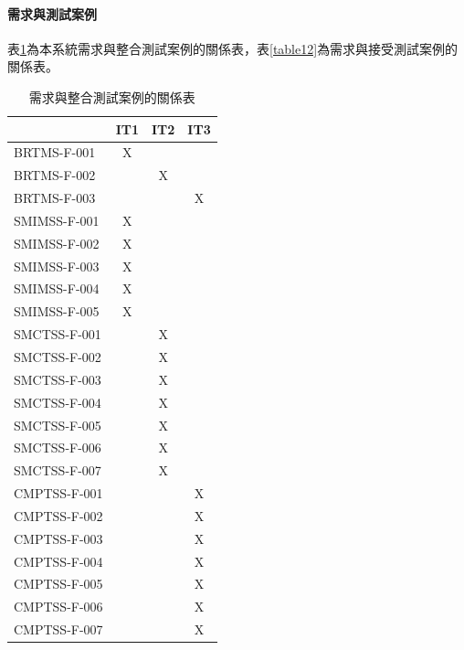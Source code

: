 			\paragraph{需求與測試案例}表\ref{table11}為本系統需求與整合測試案例的關係表，表\ref{table12}為需求與接受測試案例的關係表。

				\begin{table}[htbp]
				\centering
				\caption{需求與整合測試案例的關係表}
				\label{table11}
				\begin{tabular}{|l|c|c|c|}
				\hline
				 & \multicolumn{1}{l|}{IT1} & \multicolumn{1}{l|}{IT2} & \multicolumn{1}{l|}{IT3} \\ \hline
				BRTMS-F-001 & X &  &  \\ \hline
				BRTMS-F-002 &  & X &  \\ \hline
				BRTMS-F-003 &  &  & X \\ \hline
				SMIMSS-F-001 & X &  &  \\ \hline
				SMIMSS-F-002 & X &  &  \\ \hline
				SMIMSS-F-003 & X &  &  \\ \hline
				SMIMSS-F-004 & X &  &  \\ \hline
				SMIMSS-F-005 & X &  &  \\ \hline
				SMCTSS-F-001 &  & X &  \\ \hline
				SMCTSS-F-002 &  & X &  \\ \hline
				SMCTSS-F-003 &  & X &  \\ \hline
				SMCTSS-F-004 &  & X &  \\ \hline
				SMCTSS-F-005 &  & X &  \\ \hline
				SMCTSS-F-006 &  & X &  \\ \hline
				SMCTSS-F-007 &  & X &  \\ \hline
				CMPTSS-F-001 &  &  & X \\ \hline
				CMPTSS-F-002 &  &  & X \\ \hline
				CMPTSS-F-003 & \multicolumn{1}{l|}{} & \multicolumn{1}{l|}{} & X \\ \hline
				CMPTSS-F-004 & \multicolumn{1}{l|}{} & \multicolumn{1}{l|}{} & X \\ \hline
				CMPTSS-F-005 & \multicolumn{1}{l|}{} & \multicolumn{1}{l|}{} & X \\ \hline
				CMPTSS-F-006 & \multicolumn{1}{l|}{} & \multicolumn{1}{l|}{} & X \\ \hline
				CMPTSS-F-007 & \multicolumn{1}{l|}{} & \multicolumn{1}{l|}{} & X \\ \hline
				\end{tabular}
				\end{table}

